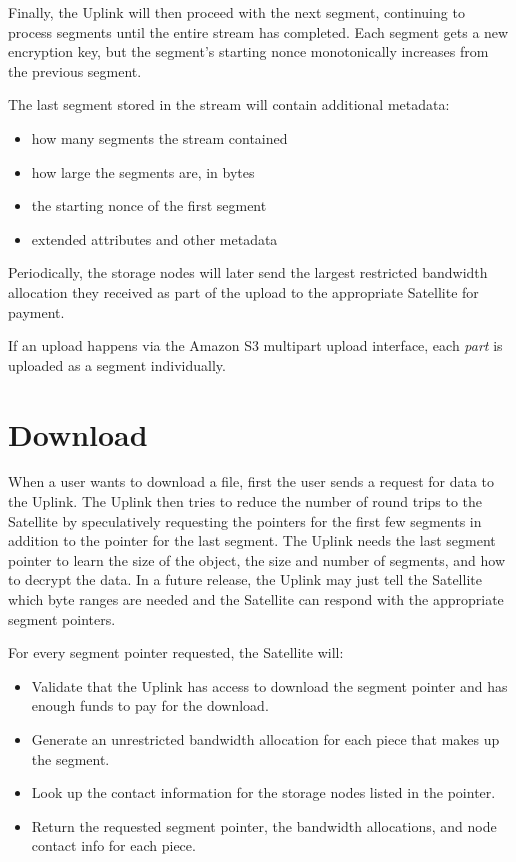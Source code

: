 \documentclass[8pt,fleqn,openany]{book}
\begin{document}
Finally, the Uplink will then proceed with the next segment, continuing to
process segments until the entire stream has completed. Each segment gets
a new encryption key, but the segment's starting nonce monotonically increases
from the previous segment.

The last segment stored in the stream will contain additional metadata:
\begin{itemize}
\item how many segments the stream contained
\item how large the segments are, in bytes
\item the starting nonce of the first segment
\item extended attributes and other metadata
\end{itemize}

Periodically, the storage nodes will later send the largest restricted
bandwidth allocation they received as part of the upload to the appropriate
Satellite for payment.

If an upload happens via the Amazon S3 multipart upload interface, each
{\em part} is uploaded as a segment individually.

\section{Download}

When a user wants to download a file, first the user sends a request for
data to the Uplink.
  The Uplink then tries to reduce the number of round trips to the Satellite
  by speculatively requesting the pointers for the first few segments in
  addition to the pointer for the last segment. The Uplink needs the last
  segment pointer to learn the size of the object, the size and number of segments,
  and how to decrypt the data. In a future release, the Uplink may just tell
  the Satellite which byte ranges are needed and the Satellite can respond with
  the appropriate segment pointers.

For every segment pointer requested, the Satellite will:
  \begin{itemize}
  \item Validate that the Uplink has access to download the segment pointer
    and has enough funds to pay for the download.
  \item Generate an unrestricted bandwidth allocation for each piece that
    makes up the segment.
  \item Look up the contact information for the storage nodes listed in the
  pointer.
  \item Return the requested segment pointer, the bandwidth allocations, and
    node contact info for each piece.
  \end{itemize}
\end{document}
